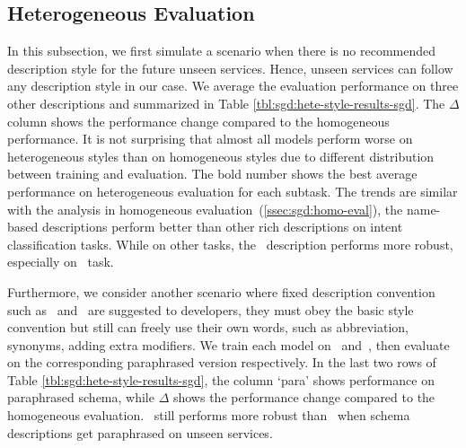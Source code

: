 \subsection{Heterogeneous Evaluation}
\label{ssec:sgd:heter-eval}
In this subsection, we first simulate a scenario when there is no
recommended description style for the future unseen services. Hence,
unseen services can follow any description style in our case. We
average the evaluation performance on three other descriptions and
summarized in Table \ref{tbl:sgd:hete-style-results-sgd}. The $\Delta$ column
shows the performance change compared to the homogeneous
performance. It is not surprising that almost all models perform worse
on heterogeneous styles than on homogeneous styles due to different
distribution between training and evaluation. The bold number shows
the best average performance on heterogeneous evaluation for each
subtask. The trends are similar with the analysis in homogeneous
evaluation~(\autoref{ssec:sgd:homo-eval}), the name-based descriptions perform
better than other rich descriptions on intent classification
tasks. While on other tasks, the \ORIGIN~description performs more
robust, especially on \NSL~task.

Furthermore, we consider another scenario where fixed description
convention such as \NAMEONLY~and \ORIGIN~are suggested to developers,
they must obey the basic style convention but still can freely use
their own words, such as abbreviation, synonyms, adding extra
modifiers. We train each model on \NAMEONLY~and~\ORIGIN, then evaluate
on the corresponding paraphrased version respectively. In the last two
rows of Table \ref{tbl:sgd:hete-style-results-sgd}, the column `para'
shows performance on paraphrased schema, while $\Delta$ shows the
performance change compared to the homogeneous evaluation.
\ORIGIN~still performs more robust than \NAMEONLY~when schema
descriptions get paraphrased on unseen services.

